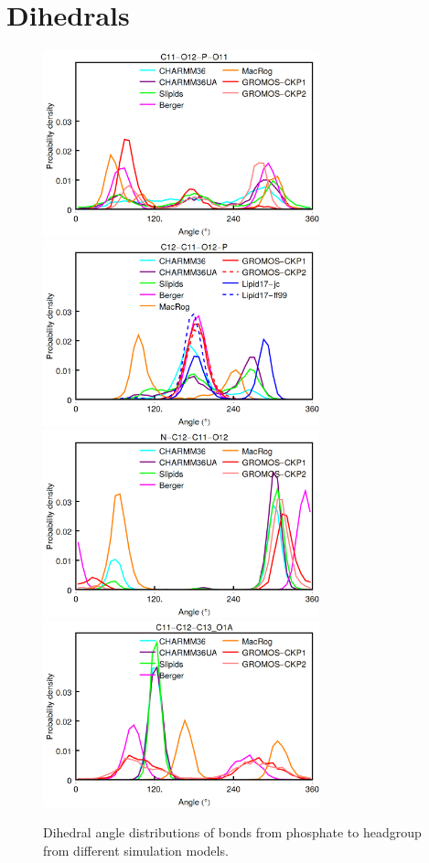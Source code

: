 \documentclass[aps,prl,superscriptaddress,twocolumn]{revtex4}
\begin{document}
\section{Dihedrals}
\begin{figure}[]
  \centering
  \includegraphics[width=8.0cm]{../Figs/diheds_pops8.png}
  \includegraphics[width=8.0cm]{../Figs/diheds_pops9.png}
  \includegraphics[width=8.0cm]{../Figs/diheds_pops10.png}
  \includegraphics[width=8.0cm]{../Figs/diheds_pops11.png}
  \caption{\label{dihedralsHG}
    Dihedral angle distributions of bonds from phosphate to headgroup from different simulation models.
  }
\end{figure}
\end{document}
